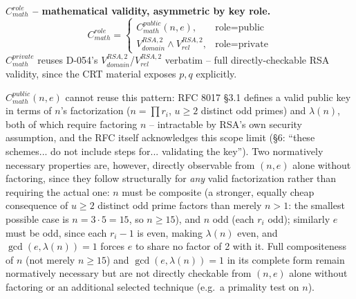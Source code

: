 \documentclass[11pt,a4paper]{article}
\begin{document}
\textbf{$C_{math}^{role}$ -- mathematical validity, asymmetric by key role.}
\[
C_{math}^{role} =
\begin{cases}
C_{math}^{public}(n,e), & \text{role}=\text{public} \\
V_{domain}^{RSA,2} \wedge V_{rel}^{RSA,2}, & \text{role}=\text{private}
\end{cases}
\]
$C_{math}^{private}$ reuses D-054's $V_{domain}^{RSA,2}$/$V_{rel}^{RSA,2}$ verbatim -- full directly-checkable RSA validity, since the CRT material exposes $p,q$ explicitly.

$C_{math}^{public}(n,e)$ cannot reuse this pattern: RFC 8017 \S3.1 defines a valid public key in terms of $n$'s factorization ($n=\prod r_i$, $u\ge2$ distinct odd primes) and $\lambda(n)$, both of which require factoring $n$ -- intractable by RSA's own security assumption, and the RFC itself acknowledges this scope limit (\S6: ``these schemes... do not include steps for... validating the key''). Two normatively necessary properties are, however, directly observable from $(n,e)$ alone without factoring, since they follow structurally for \emph{any} valid factorization rather than requiring the actual one: $n$ must be composite (a stronger, equally cheap consequence of $u\ge2$ distinct odd prime factors than merely $n>1$: the smallest possible case is $n=3\cdot5=15$, so $n\ge15$), and $n$ odd (each $r_i$ odd); similarly $e$ must be odd, since each $r_i-1$ is even, making $\lambda(n)$ even, and $\gcd(e,\lambda(n))=1$ forces $e$ to share no factor of 2 with it. Full compositeness of $n$ (not merely $n\ge15$) and $\gcd(e,\lambda(n))=1$ in its complete form remain normatively necessary but are not directly checkable from $(n,e)$ alone without factoring or an additional selected technique (e.g.\ a primality test on $n$).
\end{document}

